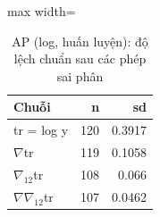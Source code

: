 \begin{table}[H]
\centering\small
\caption{AP (log, huấn luyện): độ lệch chuẩn sau các phép sai phân}\label{tab:tab_b12_10_sd}
\begin{adjustbox}{max width=\linewidth}
\begin{tabular}{lrr}
\toprule
Chuỗi & n & sd \\
\midrule
tr = log y & 120 & 0.3917 \\
$\nabla$tr & 119 & 0.1058 \\
$\nabla_{12}$tr & 108 & 0.066 \\
$\nabla\nabla_{12}$tr & 107 & 0.0462 \\
\bottomrule
\end{tabular}
\end{adjustbox}
\end{table}
